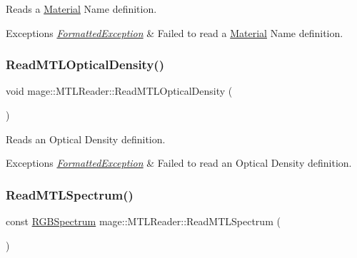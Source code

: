 Reads a \hyperlink{structmage_1_1_material}{Material} Name definition.


\begin{DoxyExceptions}{Exceptions}
{\em \hyperlink{structmage_1_1_formatted_exception}{Formatted\+Exception}} & Failed to read a \hyperlink{structmage_1_1_material}{Material} Name definition. \\
\hline
\end{DoxyExceptions}
\hypertarget{classmage_1_1_m_t_l_reader_a06576927d764c9cd2be41871f137fac4}{}\label{classmage_1_1_m_t_l_reader_a06576927d764c9cd2be41871f137fac4} 
\subsubsection{\texorpdfstring{Read\+M\+T\+L\+Optical\+Density()}{ReadMTLOpticalDensity()}}
{\footnotesize\ttfamily void mage\+::\+M\+T\+L\+Reader\+::\+Read\+M\+T\+L\+Optical\+Density (\begin{DoxyParamCaption}{ }\end{DoxyParamCaption})\hspace{0.3cm}{\ttfamily [private]}}

Reads an Optical Density definition.


\begin{DoxyExceptions}{Exceptions}
{\em \hyperlink{structmage_1_1_formatted_exception}{Formatted\+Exception}} & Failed to read an Optical Density definition. \\
\hline
\end{DoxyExceptions}
\hypertarget{classmage_1_1_m_t_l_reader_a607a55ab2e68d3bc9b879d7e3377f0e3}{}\label{classmage_1_1_m_t_l_reader_a607a55ab2e68d3bc9b879d7e3377f0e3} 
\subsubsection{\texorpdfstring{Read\+M\+T\+L\+Spectrum()}{ReadMTLSpectrum()}}
{\footnotesize\ttfamily const \hyperlink{structmage_1_1_r_g_b_spectrum}{R\+G\+B\+Spectrum} mage\+::\+M\+T\+L\+Reader\+::\+Read\+M\+T\+L\+Spectrum (\begin{DoxyParamCaption}{ }\end{DoxyParamCaption})\hspace{0.3cm}{\ttfamily [private]}}

